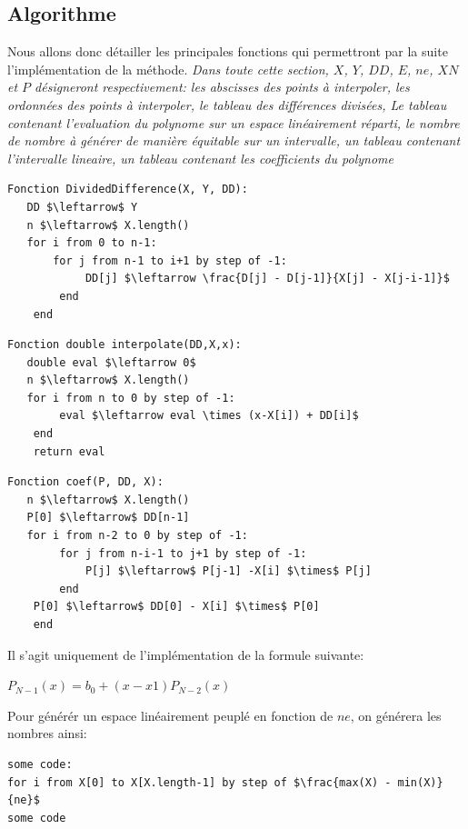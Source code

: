 \documentclass{report}
\begin{document}
\subsection{Algorithme}
Nous allons donc détailler les principales fonctions qui permettront par la suite l'implémentation de la méthode.
\textit{Dans toute cette section, $X$, $Y$, $DD$, $E$, $ne$, $XN$ et $P$ désigneront respectivement: les abscisses des points à interpoler, les ordonnées des points à interpoler, le tableau des différences divisées, Le tableau contenant l'evaluation du polynome sur un espace linéairement réparti, le nombre de nombre à générer de manière équitable sur un intervalle, un tableau contenant l'intervalle lineaire, un tableau contenant les coefficients du polynome}
\begin{lstlisting}[mathescape=true, frame=single, basicstyle=\linespread{1.5}\fontsize{8}{10}\selectfont, caption="Divided Difference function"]
Fonction DividedDifference(X, Y, DD):
   DD $\leftarrow$ Y
   n $\leftarrow$ X.length()
   for i from 0 to n-1:
   	   for j from n-1 to i+1 by step of -1:
   	   		DD[j] $\leftarrow \frac{D[j] - D[j-1]}{X[j] - X[j-i-1]}$
		end
    end
\end{lstlisting}
\begin{lstlisting}[mathescape=true, frame=single, basicstyle=\linespread{1.5}\fontsize{8}{10}\selectfont, caption="interpolate function"]
Fonction double interpolate(DD,X,x):
   double eval $\leftarrow 0$
   n $\leftarrow$ X.length()
   for i from n to 0 by step of -1:
   		eval $\leftarrow eval \times (x-X[i]) + DD[i]$
   	end
   	return eval
\end{lstlisting}
\begin{lstlisting}[mathescape=true, frame=single, basicstyle=\linespread{1.5}\fontsize{8}{10}\selectfont, caption="find coefficient function"]
Fonction coef(P, DD, X):
   n $\leftarrow$ X.length()
   P[0] $\leftarrow$ DD[n-1]
   for i from n-2 to 0 by step of -1:
   		for j from n-i-1 to j+1 by step of -1:
   			P[j] $\leftarrow$ P[j-1] -X[i] $\times$ P[j]
   		end
   	P[0] $\leftarrow$ DD[0] - X[i] $\times$ P[0]
   	end
\end{lstlisting}
Il s'agit uniquement de l'implémentation de la formule suivante:
\begin{center}
 $P_{N-1}(x) = b_0 + (x-x1)P_{N-2}(x)$
\end{center}
Pour générér un espace linéairement peuplé en fonction de $ne$, on générera les nombres ainsi:
\begin{lstlisting}[mathescape=true, frame=single, basicstyle=\linespread{1.5}\fontsize{8}{10}\selectfont, caption="generate linear space"]
some code:
for i from X[0] to X[X.length-1] by step of $\frac{max(X) - min(X)}{ne}$
some code
\end{lstlisting}
\end{document}
